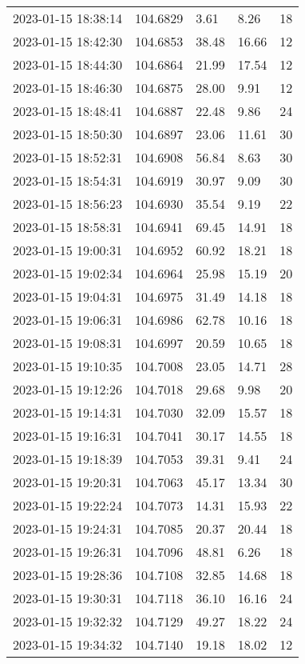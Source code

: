 \documentclass{nature_plusfigure}
\begin{document}
\begin{supplement}
\begin{center}
\begin{longtable}{lllll}
2023-01-15 18:38:14 & 104.6829 & 3.61 & 8.26 & 18 \\ 
2023-01-15 18:42:30 & 104.6853 & 38.48 & 16.66 & 12 \\ 
2023-01-15 18:44:30 & 104.6864 & 21.99 & 17.54 & 12 \\ 
2023-01-15 18:46:30 & 104.6875 & 28.00 & 9.91 & 12 \\ 
2023-01-15 18:48:41 & 104.6887 & 22.48 & 9.86 & 24 \\ 
2023-01-15 18:50:30 & 104.6897 & 23.06 & 11.61 & 30 \\ 
2023-01-15 18:52:31 & 104.6908 & 56.84 & 8.63 & 30 \\ 
2023-01-15 18:54:31 & 104.6919 & 30.97 & 9.09 & 30 \\ 
2023-01-15 18:56:23 & 104.6930 & 35.54 & 9.19 & 22 \\ 
2023-01-15 18:58:31 & 104.6941 & 69.45 & 14.91 & 18 \\ 
2023-01-15 19:00:31 & 104.6952 & 60.92 & 18.21 & 18 \\ 
2023-01-15 19:02:34 & 104.6964 & 25.98 & 15.19 & 20 \\ 
2023-01-15 19:04:31 & 104.6975 & 31.49 & 14.18 & 18 \\ 
2023-01-15 19:06:31 & 104.6986 & 62.78 & 10.16 & 18 \\ 
2023-01-15 19:08:31 & 104.6997 & 20.59 & 10.65 & 18 \\ 
2023-01-15 19:10:35 & 104.7008 & 23.05 & 14.71 & 28 \\ 
2023-01-15 19:12:26 & 104.7018 & 29.68 & 9.98 & 20 \\ 
2023-01-15 19:14:31 & 104.7030 & 32.09 & 15.57 & 18 \\ 
2023-01-15 19:16:31 & 104.7041 & 30.17 & 14.55 & 18 \\ 
2023-01-15 19:18:39 & 104.7053 & 39.31 & 9.41 & 24 \\ 
2023-01-15 19:20:31 & 104.7063 & 45.17 & 13.34 & 30 \\ 
2023-01-15 19:22:24 & 104.7073 & 14.31 & 15.93 & 22 \\ 
2023-01-15 19:24:31 & 104.7085 & 20.37 & 20.44 & 18 \\ 
2023-01-15 19:26:31 & 104.7096 & 48.81 & 6.26 & 18 \\ 
2023-01-15 19:28:36 & 104.7108 & 32.85 & 14.68 & 18 \\ 
2023-01-15 19:30:31 & 104.7118 & 36.10 & 16.16 & 24 \\ 
2023-01-15 19:32:32 & 104.7129 & 49.27 & 18.22 & 24 \\ 
2023-01-15 19:34:32 & 104.7140 & 19.18 & 18.02 & 12 \\ 

\end{longtable}
\end{center}
\end{supplement}
\end{document}
